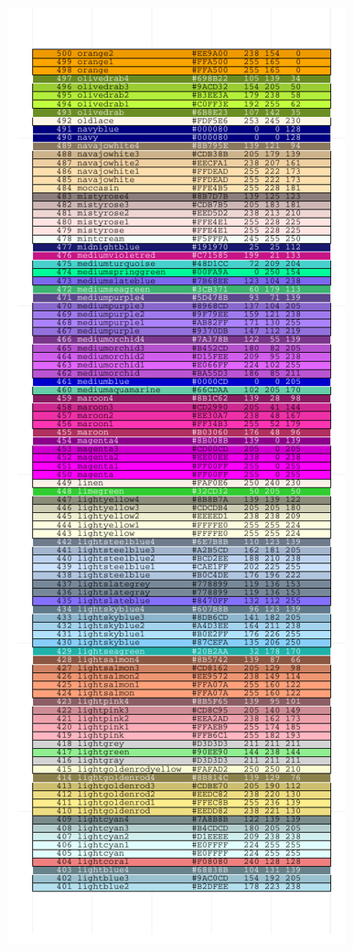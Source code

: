 \documentclass[letterpaper]{article}
\begin{document}
\begin{center}
\begin{figure}[ht]
\begin{minipage}[b]{0.5\linewidth}
\includegraphics{ggplotCheatSheet-009}
\end{minipage}

\end{figure}
\end{center}
\end{document}
